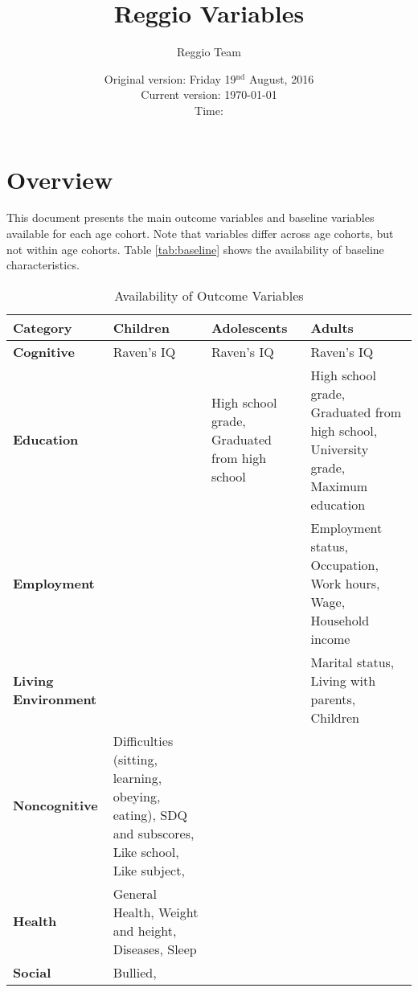 \documentclass[12pt]{article}
\begin{document}
\title{Reggio Variables}
\author{Reggio Team}
\date{Original version: Friday 19$^{\text{nd}}$ August, 2016 \\ Current version: \today \\ \vspace{1em} Time: \currenttime}
\maketitle

\doublespacing

\section{Overview}

This document presents the main outcome variables and baseline variables available for each age cohort. Note that variables differ across age cohorts, but not within age cohorts. Table \ref{tab:baseline} shows the availability of baseline characteristics. 
\begin{landscape}
\begin{table}[H] \caption{Availability of Outcome Variables} \label{tab:outcome}
\begin{center}
\begin{tabular}{L{4.4cm} L{6cm} L{6cm} L{6cm}}
\toprule
\textbf{Category} & \textbf{Children} & \textbf{Adolescents} & \textbf{Adults} \\ \midrule
\textbf{Cognitive} & Raven's IQ & Raven's IQ & Raven's IQ  \\ \midrule
\textbf{Education} & & High school grade, Graduated from high school  & High school grade, Graduated from high school, University grade, Maximum education \\ \midrule
\textbf{Employment} &  & & Employment status, Occupation, Work hours, Wage, Household income \\ \midrule
\textbf{Living Environment} & & & Marital status, Living with parents, Children  \\ \midrule
\textbf{Noncognitive} & Difficulties (sitting, learning, obeying, eating), SDQ and subscores, Like school, Like subject,    & & \\ \midrule
\textbf{Health} & General Health, Weight and height, Diseases, Sleep \\ \midrule
\textbf{Social} & Bullied, \\ \bottomrule

\end{tabular}
\end{center}
\end{table}
\end{landscape}
\end{document}
